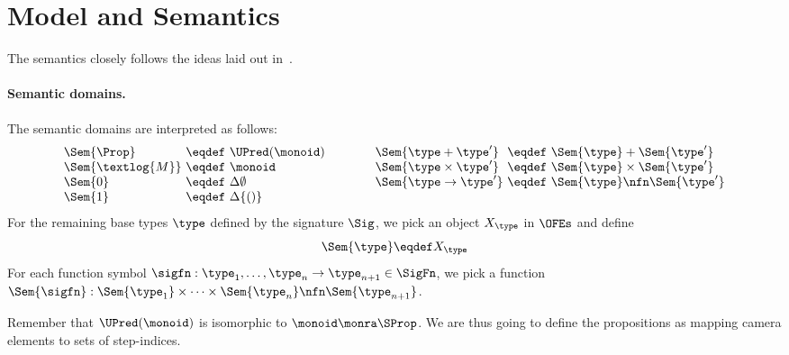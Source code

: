 \section{Model and Semantics}
\label{sec:model}

The semantics closely follows the ideas laid out in~\cite{catlogic}.

\paragraph{Semantic domains.}

The semantic  domains are interpreted as follows:
\[
\begin{array}[t]{@{}l@{\ }c@{\ }l@{}}
\Sem{\Prop} &\eqdef& \UPred(\monoid)  \\
\Sem{\textlog{M}} &\eqdef& \monoid \\
\Sem{0} &\eqdef& \Delta \emptyset \\
\Sem{1} &\eqdef& \Delta \{ () \}
\end{array}
\qquad\qquad
\begin{array}[t]{@{}l@{\ }c@{\ }l@{}}
\Sem{\type + \type'} &\eqdef& \Sem{\type} + \Sem{\type'} \\
\Sem{\type \times \type'} &\eqdef& \Sem{\type} \times \Sem{\type'} \\
\Sem{\type \to \type'} &\eqdef& \Sem{\type} \nfn \Sem{\type'} \\
\end{array}
\]
For the remaining base types $\type$ defined by the signature $\Sig$, we pick an object $X_\type$ in $\OFEs$ and define
\[
\Sem{\type} \eqdef X_\type
\]
For each function symbol $\sigfn : \type_1, \dots, \type_n \to \type_{n+1} \in \SigFn$, we pick a function $\Sem{\sigfn} : \Sem{\type_1} \times \dots \times \Sem{\type_n} \nfn \Sem{\type_{n+1}}$.


Remember that $\UPred(\monoid)$ is isomorphic to $\monoid \monra \SProp$.
We are thus going to define the propositions as mapping camera elements to sets of step-indices.

